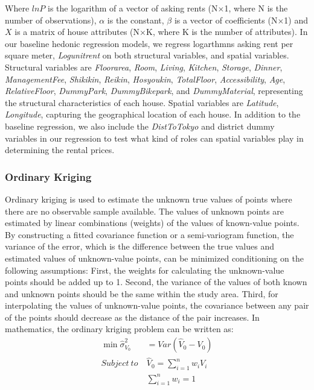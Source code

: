 \documentclass[a4paper, 12pt]{article} %
\newcommand{\var}[1][\textit]{#1}
\begin{document}
\noindent Where $ln P$ is the logarithm of a vector of asking rents (N$\times$1, where N is the number of observations), $\alpha$ is the constant,  $\beta$ is a vector of coefficients (N$\times$1) and $X$ is a matrix of house attributes (N$\times$K, where K is the number of attributes). In our baseline hedonic regression models, we regress logarthmns asking rent per square meter, \var{Logunitrent} on both structural variables, and spatial variables. Structural variables are \var{Floorarea}, \var{Room}, \var{Living}, \var{Kitchen}, \var{Storage}, \var{Dinner}, \var{ManagementFee}, \var{Shikikin}, \var{Reikin}, \var{Hosyoukin}, \var{TotalFloor}, \var{Accessibility}, \var{Age}, \var{RelativeFloor}, \var{DummyPark}, \var{DummyBikepark}, and \var{DummyMaterial}, representing the structural characteristics of each house. Spatial variables are \var{Latitude}, \var{Longitude}, capturing the geographical location of each house. In addition to the baseline regression, we also include the \var{DistToTokyo} and district dummy variables in our regression to test what kind of roles can spatial variables play in determining the rental prices.

\subsubsection{Ordinary Kriging}
Ordinary kriging is used to estimate the unknown true values of points where there are no observable sample available. The values of unknown points are estimated by linear combinations (weights) of the values of known-value points. By constructing a fitted covariance function or a semi-variogram function, the variance of the error, which is the difference between the true values and estimated values of unknown-value points, can be minimized conditioning on the following assumptions: First, the weights for calculating the unknown-value points should be added up to 1. Second, the variance of the values of both known and unknown points should be the same within the study area. Third, for interpolating the values of unknown-value points, the covariance between any pair of the points should decrease as the distance of the pair increases. In mathematics, the ordinary kriging problem can be written as: 
\begin{equation}
\begin{split}
\label{eq2}
\min \widehat{\sigma}^2_{V_0} &= Var(\widehat{V}_0 - V_0) \\
Subject \ to \ & \widehat{V}_0 = \sum_{i=1}^n w_iV_i \\
& \sum_{i=1}^n w_i = 1
\end{split}
\end{equation}
\end{document}
